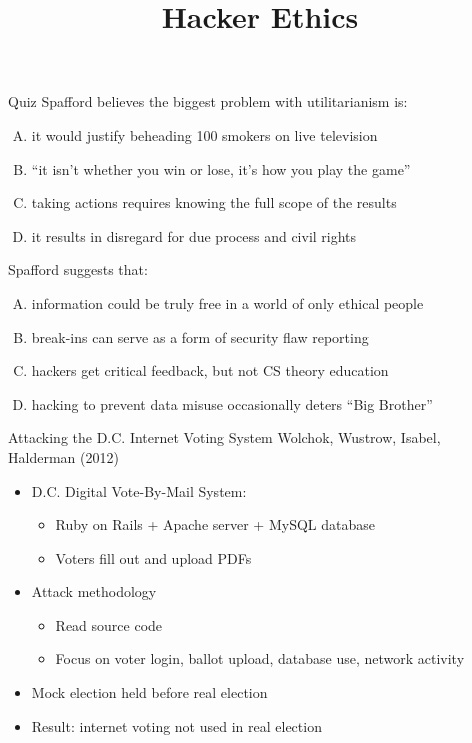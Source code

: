 \documentclass{beamer}
\title{Hacker Ethics}
\date{}
\begin{document}
\begin{frame}
\titlepage
\end{frame}

\begin{frame}{Quiz}
Spafford believes the biggest problem with utilitarianism is:
\begin{enumerate}[(A)]
\item<1> it would justify beheading 100 smokers on live television
\item<1> ``it isn't whether you win or lose, it's how you play the game''
\item<1-2> taking actions requires knowing the full scope of the results
\item<1> it results in disregard for due process and civil rights
\end{enumerate}
\bigskip
Spafford suggests that:
\begin{enumerate}[(A)]
\item<1-2> information could be truly free in a world of only ethical people
\item<1> break-ins can serve as a form of security flaw reporting %
\item<1> hackers get critical feedback, but not CS theory education %
\item<1> hacking to prevent data misuse occasionally deters ``Big Brother''
\end{enumerate}
\end{frame}

\begin{frame}{Attacking the D.C. Internet Voting System}
Wolchok, Wustrow, Isabel, Halderman (2012)
\begin{itemize}
\item D.C. Digital Vote-By-Mail System:
\begin{itemize}
\item Ruby on Rails + Apache server + MySQL database
\item Voters fill out and upload PDFs
\end{itemize}
\item Attack methodology
\begin{itemize}
\item Read source code
\item Focus on voter login, ballot upload, database use, network activity
\end{itemize}
\item Mock election held before real election
\item Result: internet voting not used in real election
\end{itemize}
\end{frame}
\end{document}
